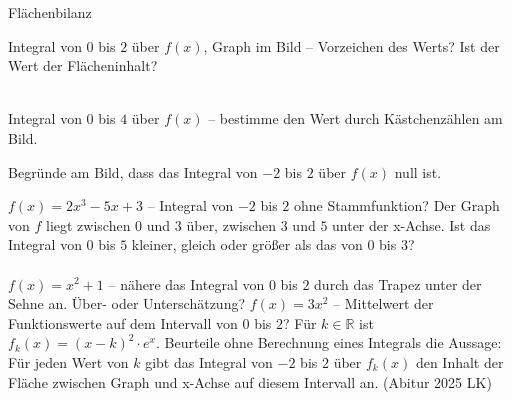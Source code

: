 \setcounter{aufgabe}{16}

\begin{aufgabe}{Flächenbilanz}
\begin{teile}
\teil Integral von $0$ bis $2$ über $f(x)$, Graph im Bild – Vorzeichen des Werts? Ist der Wert der Flächeninhalt? \\ \\ 

\begin{ksys}[xmin=-3,xmax=5,ymin=-4,ymax=4,xstep=1,ystep=1,ablesen]\end{ksys}
\teil Integral von $0$ bis $4$ über $f(x)$ – bestimme den Wert durch Kästchenzählen am Bild.

\begin{ksys}[xmin=-1,xmax=5,ymin=-4,ymax=4,xstep=1,ystep=1,ablesen]\end{ksys}
\teil Begründe am Bild, dass das Integral von $-2$ bis $2$ über $f(x)$ null ist.

\begin{ksys}[xmin=-3,xmax=5,ymin=-4,ymax=4,xstep=1,ystep=1,ablesen]\end{ksys}
\teil $f(x) = 2x^3 - 5x + 3$ – Integral von $-2$ bis $2$ ohne Stammfunktion?
\teil Der Graph von $f$ liegt zwischen $0$ und $3$ über, zwischen $3$ und $5$ unter der x-Achse. Ist das Integral von $0$ bis $5$ kleiner, gleich oder größer als das von $0$ bis $3$? \\ \\ 
\teil $f(x) = x^2 + 1$ – nähere das Integral von $0$ bis $2$ durch das Trapez unter der Sehne an. Über- oder Unterschätzung?
\teil $f(x) = 3x^2$ – Mittelwert der Funktionswerte auf dem Intervall von $0$ bis $2$?
\teil Für $k \in \mathbb{R}$ ist $f_k(x) = (x - k)^2 \cdot e^{x}$. Beurteile ohne Berechnung eines Integrals die Aussage: Für jeden Wert von $k$ gibt das Integral von $-2$ bis $2$ über $f_k(x)$ den Inhalt der Fläche zwischen Graph und x-Achse auf diesem Intervall an. \hfill (Abitur 2025 LK)
\end{teile}
\end{aufgabe}


